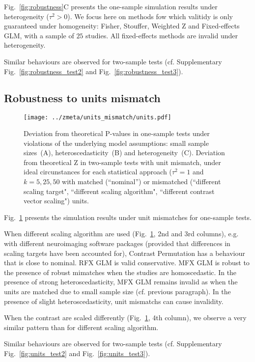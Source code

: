 \documentclass[preprint]{elsarticle}
\newcommand{\nStudies}{k}
\newcommand{\varBetween}{\tau^2}
\begin{document}
Fig.~\ref{fig:robustness}C presents the one-sample simulation results under heterogeneity ($\varBetween>0$). We focus here on methods fow which valitidy is only guaranteed under homogeneity: Fisher, Stouffer, Weighted Z and Fixed-effects GLM, with a sample of $25$ studies. All fixed-effects methods are invalid under heterogeneity.

Similar behaviours are observed for two-sample tests (cf. Supplementary Fig.~\ref{fig:robustness_test2} and Fig.~\ref{fig:robustness_test3}).

\subsection{Robustness to units mismatch}

\begin{figure}[h]
	\centering
 	\texttt{[image: ../zmeta/units\_mismatch/units.pdf]}
	\caption{Deviation from theoretical P-values in one-sample tests under violations of the underlying model assumptions: small sample sizes~(A), heteroscedasticity~(B) and heterogeneity~(C). Deviation from theoretical Z in two-sample tests with unit mismatch, under ideal circunstances for each statistical approach ($\varBetween=1$ and $\nStudies = 5, 25, 50$ with matched (``nominal'') or mismatched (``different scaling target", ``different scaling algorithm", ``different contrast vector scaling") units.}
	\label{fig:units}
\end{figure}

Fig.~\ref{fig:units} presents the simulation results under unit mismatches for one-sample tests. 

When different scaling algorithm are used (Fig.~\ref{fig:units}, 2nd and 3rd columns), e.g. with different neuroimaging software packages (provided that differences in scaling targets have been accounted for), Contrast Permutation has a behaviour that is close to nominal. RFX GLM is valid conservative. MFX GLM is robust to the presence of robust mimatches when the studies are homoscedastic. In the presence of strong heteroscedasticity, MFX GLM remains invalid as when the units are matched due to small sample size (cf. previous paragraph). In the presence of slight heteroscedasticity, unit mismatchs can cause invalidity. 

When the contrast are scaled differently (Fig.~\ref{fig:units}, 4th column), we observe a very similar pattern than for different scaling algorithm.

Similar behaviours are observed for two-sample tests (cf. Supplementary Fig.~\ref{fig:units_test2} and Fig.~\ref{fig:units_test3}).
\end{document}
